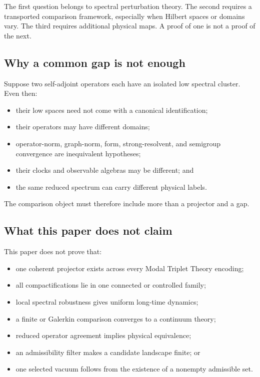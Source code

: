 \documentclass[11pt]{article}
\theoremstyle{definition}
\theoremstyle{remark}
\newcommand{\1}{\mathbf 1}
\newcommand{\MTT}{Modal Triplet Theory}
\begin{document}
The first question belongs to spectral perturbation theory.  The second
requires a transported comparison framework, especially when Hilbert
spaces or domains vary.  The third requires additional physical maps.  A
proof of one is not a proof of the next.

\subsection{Why a common gap is not enough}

Suppose two self-adjoint operators each have an isolated low spectral
cluster.  Even then:
\begin{itemize}[leftmargin=2em]
\item their low spaces need not come with a canonical identification;
\item their operators may have different domains;
\item operator-norm, graph-norm, form, strong-resolvent, and semigroup
      convergence are inequivalent hypotheses;
\item their clocks and observable algebras may be different; and
\item the same reduced spectrum can carry different physical labels.
\end{itemize}
The comparison object must therefore include more than a projector and a
gap.

\subsection{What this paper does not claim}

This paper does not prove that:
\begin{itemize}[leftmargin=2em]
\item one coherent projector exists across every \MTT{} encoding;
\item all compactifications lie in one connected or controlled family;
\item local spectral robustness gives uniform long-time dynamics;
\item a finite or Galerkin comparison converges to a continuum theory;
\item reduced operator agreement implies physical equivalence;
\item an admissibility filter makes a candidate landscape finite; or
\item one selected vacuum follows from the existence of a nonempty
      admissible set.
\end{itemize}
\end{document}

